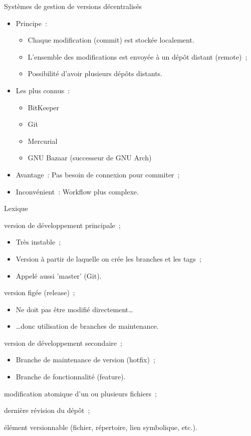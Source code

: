 \begin{frame}{Systèmes de gestion de versions décentralisés}
\begin{itemize}[<+->]
 \item Principe~:
 \begin{itemize}
  \item Chaque modification (commit) est stockée localement.
  \item L'ensemble des modifications est envoyée à un dépôt distant (remote)~;
  \item Possibilité d'avoir plusieurs dépôts distants.
 \end{itemize}
 \item Les plus connus~:
 \begin{itemize}[<+->]
  \item BitKeeper
  \item Git
  \item Mercurial
  \item GNU Bazaar (successeur de GNU Arch)
 \end{itemize}
 \item Avantage~: Pas besoin de connexion pour commiter~;
 \item Inconvénient~: Workflow plus complexe.
\end{itemize}
\end{frame}

\begin{frame}{Lexique}
\begin{description}[align=left]
 \item [Trunk] version de développement principale~;
 \begin{itemize}[<+->]
  \item Très instable~;
  \item Version à partir de laquelle on crée les branches et les tags~;
  \item Appelé aussi 'master' (Git).
 \end{itemize}
 \pause
 \item [Tags] version figée (release)~;
 \begin{itemize}[<+->]
  \item Ne doit pas être modifié directement\dots
  \item \dots donc utilisation de branches de maintenance.
 \end{itemize}
 \pause
 \item [Branche] version de développement secondaire~;
 \begin{itemize}[<+->]
  \item Branche de maintenance de version (hotfix)~;
  \item Branche de fonctionnalité (feature).
 \end{itemize}
 \pause
 \item [Révision/commit] modification atomique d'un ou plusieurs fichiers~;
 \pause
 \item [Head] dernière révision du dépôt~;
 \pause
 \item [Objet] élément versionnable (fichier, répertoire, lien symbolique, etc.).
\end{description}
\end{frame}

